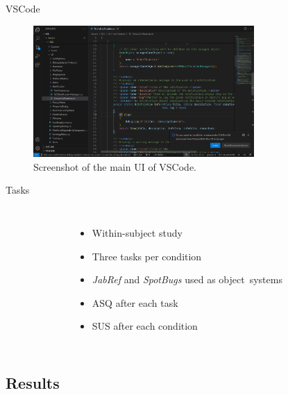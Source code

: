 \documentclass[xcolor={dvipsnames},aspectratio=169,compress,final]{beamer}
\begin{document}
\begin{frame}{VSCode}
	\begin{figure}
		\begin{center}
			\includegraphics[width=0.75\textwidth]{figures/VSCode.png}
		\end{center}
		\caption{Screenshot of the main UI of VSCode.}
	\end{figure}

\end{frame}

\begin{frame}{Tasks}
	\begin{columns}

		\vspace{-0.3cm}
		\begin{figure}
			\begin{center}
			\end{center}
		\end{figure}

		\begin{itemize}
			\item Within-subject study
			\item Three tasks per condition
			\item \emph{JabRef} and \emph{SpotBugs} used as object~systems
			\item ASQ after each task
			\item SUS after each condition
		\end{itemize}
	\end{columns}

\end{frame}

\subsection{Results}
\end{document}

